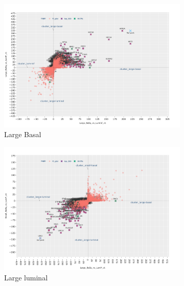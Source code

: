 \begin{appendices}
\begin{figure}[!h]
    \captionsetup[subfigure]{justification=Centering}
\centering
\begin{subfigure}[!t]{0.49\linewidth}
    \includegraphics[width=\textwidth,keepaspectratio]{Sections/Network_I/Resources/selective_pruning/pi_gsea/pi_largeBasal.png}
    \caption{Large Basal}
\end{subfigure}
\centering
\begin{subfigure}[!t]{0.49\textwidth}
    \includegraphics[width=\textwidth,keepaspectratio]{Sections/Network_I/Resources/selective_pruning/pi_gsea/pi_largeLuminal.png}
    \caption{Large luminal}
\end{subfigure}
\centering
\begin{subfigure}[!t]{0.49\linewidth}

\end{subfigure}
\end{figure}
\end{appendices}
